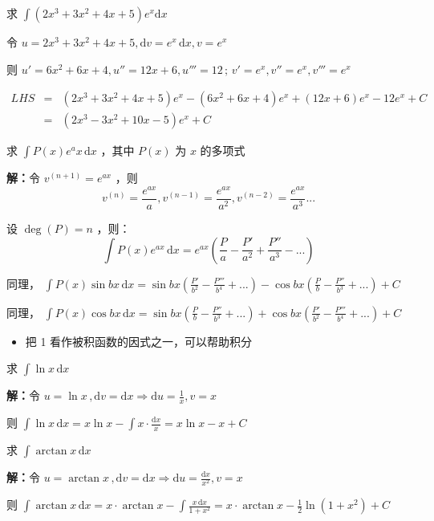 \begin{example}{}
求 $\displaystyle{\int\left(2x^3+3x^2+4x+5\right)e^x\mathrm {d}x}$ 

令 $\displaystyle{u=2x^3+3x^2+4x+5,\mathrm{d}v=e^x\,\mathrm{d}x,v=e^x}$

则 $\displaystyle{u'=6x^2+6x+4,u''=12x+6,u'''=12\,;\,v'=e^x,v''=e^x,v'''=e^x}$ 

$\begin{eqnarray*} LHS&=&(2x^3+3x^2+4x+5)e^x-(6x^2+6x+4)e^x+(12x+6)e^x-12e^x+C \\&=&(2x^3-3x^2+10x-5)e^x+C \end{eqnarray*}$ 
\end{example}
\begin{corollary}{}
求 $\displaystyle{\int P(x)e^ax\,\mathrm{d}x}$ ，其中 $P(x)$ 为 $x$ 的多项式

\textbf{解：}令 $v^{(n+1)}=e^{ax}$ ，则
$$v^{(n)}=\frac{e^{ax}}{a},v^{(n-1)}=\frac{e^{ax}}{a^2},v^{(n-2)}=\frac{e^{ax}}{a^3}...$$ 

设 $\deg (P)=n$ ，则：
$$\int P(x)e^{ax}\,\mathrm{d}x=e^{ax}\left(\frac{P}{a}-\frac{P'}{a^2}+\frac{P''}{a^3}-...\right)$$

同理， $\displaystyle{\int P(x)\sin bx\,\mathrm{d}x=\sin bx\left(\frac{P'}{b^2}-\frac{P'''}{b^4}+...\right)-\cos bx\left(\frac{P}{b}-\frac{P''}{b^3}+...\right)+C}$

同理， $\displaystyle{\int P(x)\cos bx\,\mathrm{d}x=\sin bx\left(\frac{P}{b}-\frac{P''}{b^3}+...\right)+\cos bx\left(\frac{P'}{b^2}-\frac{P'''}{b^4}+...\right)+C}$
\end{corollary}
\begin{itemize}
\item 把 1 看作被积函数的因式之一，可以帮助积分
\end{itemize}
\begin{corollary}{}
求 $\displaystyle{\int \ln x\,\mathrm{d}x}$

\textbf{解：}令 $\displaystyle{u=\ln x\,,\mathrm{d}v=\mathrm{d}x\Rightarrow \mathrm{d}u=\frac{1}{x},v=x}$ 

则 $\displaystyle{\int \ln x\,\mathrm{d}x=x\ln x-\int x\cdot\frac{\mathrm{d}x}x=x\ln x-x+C}$
\end{corollary}
\begin{corollary}{}
求 $\displaystyle{\int\arctan x\,\mathrm{d}x}$

\textbf{解：}令 $\displaystyle{u=\arctan x\,,\mathrm{d}v=\mathrm{d}x\Rightarrow \mathrm{d}u=\frac{\mathrm{d}x}{x^2},v=x}$

则 $\displaystyle{\int\arctan x\,\mathrm{d}x=x\cdot \arctan x-\int\frac{x\,\mathrm{d}x}{1+x^2}=x\cdot \arctan x-\frac{1}{2}\ln\left(1+x^2\right)+C}$ 
\end{corollary}
